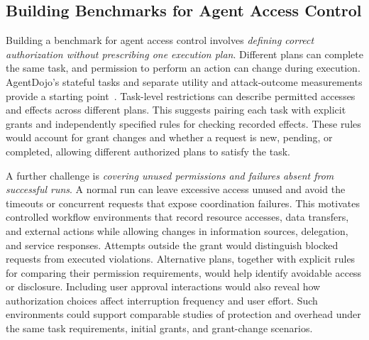 \subsection{Building Benchmarks for Agent Access Control}
Building a benchmark for agent access control involves \emph{defining correct authorization without prescribing one execution plan}. Different plans can complete the same task, and permission to perform an action can change during execution. AgentDojo's stateful tasks and separate utility and attack-outcome measurements provide a starting point~\cite{agentdojo}. Task-level restrictions can describe permitted accesses and effects across different plans. This suggests pairing each task with explicit grants and independently specified rules for checking recorded effects. These rules would account for grant changes and whether a request is new, pending, or completed, allowing different authorized plans to satisfy the task.

A further challenge is \emph{covering unused permissions and failures absent from successful runs}. A normal run can leave excessive access unused and avoid the timeouts or concurrent requests that expose coordination failures. This motivates controlled workflow environments that record resource accesses, data transfers, and external actions while allowing changes in information sources, delegation, and service responses. Attempts outside the grant would distinguish blocked requests from executed violations. Alternative plans, together with explicit rules for comparing their permission requirements, would help identify avoidable access or disclosure. Including user approval interactions would also reveal how authorization choices affect interruption frequency and user effort. Such environments could support comparable studies of protection and overhead under the same task requirements, initial grants, and grant-change scenarios.

